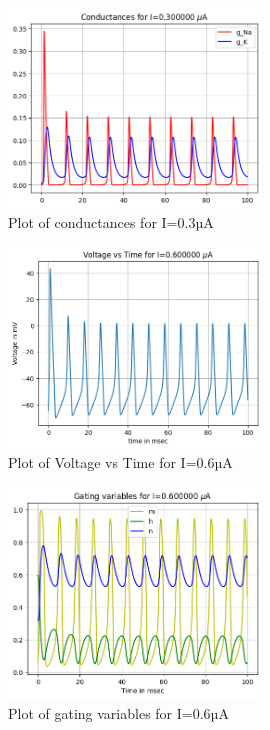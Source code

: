 \documentclass[12pt,a4paper]{report}
\begin{document}
\begin{figure}[H]
    \centering
    \includegraphics[width=0.6\textwidth]{./data/conductances_0_3uA.png}
    \caption{Plot of conductances for I=0.3µA}
    \label{fig:conductances_0_3uA}
\end{figure}

\begin{figure}[H]
    \centering
    \includegraphics[width=0.6\textwidth]{./data/voltage_time_0_6uA.png}
    \caption{Plot of Voltage vs Time for I=0.6µA}
    \label{fig:voltage_time_0_6uA}
\end{figure}

\begin{figure}[H]
    \centering
    \includegraphics[width=0.6\textwidth]{./data/gating_variables_0_6uA.png}
    \caption{Plot of gating variables for I=0.6µA}
    \label{fig:gating_variables_0_6uA}
\end{figure}
\end{document}

